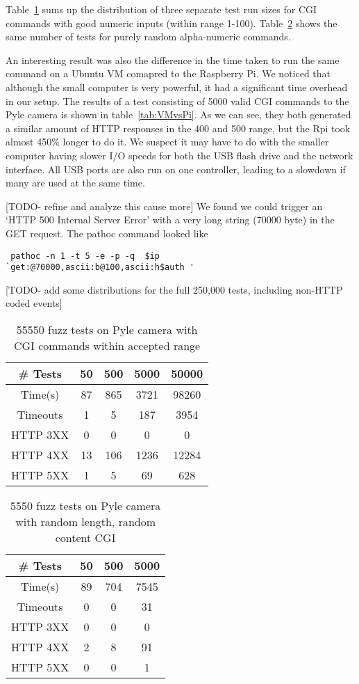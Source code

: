 \documentclass[letterpaper,twocolumn,10pt]{article}
\begin{document}
Table~\ref{tab:Pyle_Good_CGI} sums up the distribution of three separate test run sizes for CGI commands with good numeric inputs (within range 1-100). Table~\ref{tab:Pyle_Rand_CGI} shows the same number of tests for purely random alpha-numeric commands.

An interesting result was also the difference in the time taken to run the same command on a Ubuntu VM comapred to the Raspberry Pi. We noticed that although the small computer is very powerful, it had a significant time overhead in our setup. The results of a test consisting of 5000 valid CGI commands to the Pyle camera is shown in table~\ref{tab:VMvsPi}. As we can see, they both generated a similar amount of HTTP responses in the 400 and 500 range, but the Rpi took almost 450\% longer to do it. We suspect it may have to do with the smaller computer having slower I/O speeds for both the USB flash drive and the network interface. All USB ports are also run on one controller, leading to a slowdown if many are used at the same time.

[TODO- refine and analyze this cause more]
We found we could trigger an `HTTP 500 Internal Server Error' with a very long string (70000 byte) in the GET request. The pathoc command looked like 
\begin{verbatim} pathoc -n 1 -t 5 -e -p -q  $ip 
`get:@70000,ascii:b@100,ascii:h$auth '  \end{verbatim}

[TODO- add some distributions for the full 250,000 tests, including non-HTTP coded events]

\begin{table}[here]
\centering
	\begin{tabular}{ |c|c|c|c|c| }
		\hline
		\# Tests & 50 & 500 & 5000 & 50000 \\
		\hline
		\hline
		Time(s) & 87 & 865 & 3721 & 98260\\
		Timeouts & 1 & 5 & 187 & 3954 \\
		HTTP 3XX & 0 & 0 & 0 & 0\\
		HTTP 4XX & 13 & 106 & 1236 & 12284\\
		HTTP 5XX & 1 & 5 & 69 & 628\\
		\hline
	\end{tabular}
	\caption{55550 fuzz tests on Pyle camera with CGI commands within accepted range}
	\label{tab:Pyle_Good_CGI} 
\end{table}

\begin{table}[here]
\centering
	\begin{tabular}{ |c|c|c|c| }
		\hline
		\# Tests & 50 & 500 & 5000 \\
		\hline
		\hline
		Time(s) & 89 & 704 & 7545 \\
		Timeouts & 0 & 0 & 31  \\
		HTTP 3XX & 0 & 0 & 0 \\
		HTTP 4XX & 2 & 8 & 91 \\
		HTTP 5XX & 0 & 0 & 1 \\
		\hline
	\end{tabular}
	\caption{5550 fuzz tests on Pyle camera with random length, random content CGI}
	\label{tab:Pyle_Rand_CGI} 
\end{table}
\end{document}
